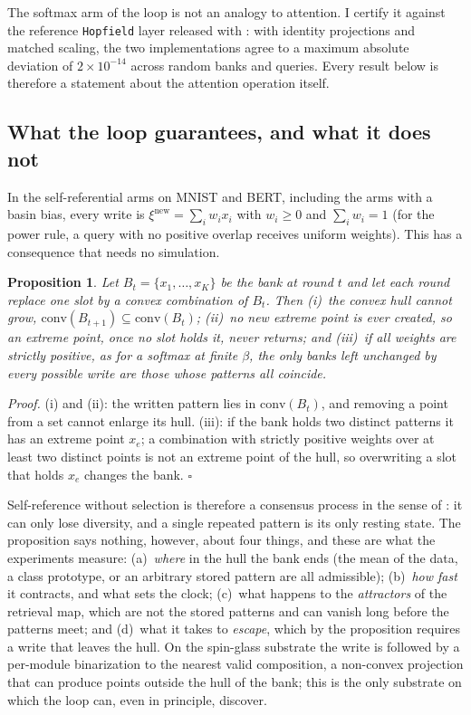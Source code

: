\documentclass[preprint,12pt,authoryear]{elsarticle}
\newtheorem{proposition}{Proposition}
\begin{document}
The softmax arm of the loop is not an analogy to attention. I certify it
against the reference \texttt{Hopfield} layer released with
\citet{ramsauer2021}: with identity projections and matched scaling, the two
implementations agree to a maximum absolute deviation of $2\times10^{-14}$
across random banks and queries. Every result below is therefore a
statement about the attention operation itself.

\subsection{What the loop guarantees, and what it does not}

In the self-referential arms on MNIST and BERT, including the arms with a
basin bias, every write is $\xi^{\mathrm{new}}=\sum_i w_i x_i$ with
$w_i\ge0$ and $\sum_i w_i=1$ (for the power rule, a query with no positive
overlap receives uniform weights). This has a consequence that needs no
simulation.

\begin{proposition}\label{prop:hull}
Let $B_t=\{x_1,\dots,x_K\}$ be the bank at round $t$ and let each round
replace one slot by a convex combination of $B_t$. Then (i)~the convex
hull cannot grow, $\mathrm{conv}(B_{t+1})\subseteq\mathrm{conv}(B_t)$;
(ii)~no new extreme point is ever created, so an extreme point, once no slot
holds it, never returns; and (iii)~if all weights are strictly positive,
as for a softmax at finite $\beta$, the only banks left unchanged by every
possible write are those whose patterns all coincide.
\end{proposition}

\noindent\emph{Proof.} (i) and (ii): the written pattern lies in
$\mathrm{conv}(B_t)$, and removing a point from a set cannot enlarge its
hull. (iii): if the bank holds two distinct patterns it has an extreme
point $x_e$; a combination with strictly positive weights over at least
two distinct points is not an extreme point of the hull, so overwriting a
slot that holds $x_e$ changes the bank. $\square$

Self-reference without selection is therefore a consensus process in the
sense of \citet{degroot1974}: it can only lose diversity, and a single
repeated pattern is its only resting state. The proposition says nothing,
however, about four things, and these are what the experiments measure:
(a)~\emph{where} in the hull the bank ends (the mean of the data, a class
prototype, or an arbitrary stored pattern are all admissible);
(b)~\emph{how fast} it contracts, and what sets the clock; (c)~what happens
to the \emph{attractors} of the retrieval map, which are not the stored
patterns and can vanish long before the patterns meet; and (d)~what it
takes to \emph{escape}, which by the proposition requires a write that
leaves the hull. On the spin-glass substrate the write is followed by a
per-module binarization to the nearest valid composition, a non-convex
projection that can produce points outside the hull of the bank; this is
the only substrate on which the loop can, even in principle, discover.
\end{document}
